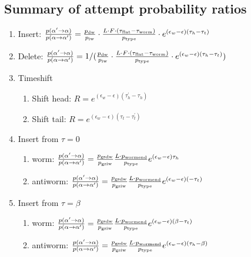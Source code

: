 \documentclass[12pt, two sided]{article}
\begin{document}
\subsection{Summary of attempt probability ratios}
	\begin{enumerate}
	\setcounter{enumi}{0}
		\item Insert: $\frac{p(\alpha^\prime\to\alpha)}{p(\alpha\to\alpha^\prime)} = \frac{p_{\rm{dw}}}{p_{\rm{iw}}} \cdot \frac{L \cdot F \cdot (\tau_{\rm{flat}}-\tau_{\rm{worm}})}{p_{\rm{type}}} \cdot e^{(\epsilon_w-\epsilon)(\tau_h-\tau_t)}$
		\item Delete: $\frac{p(\alpha^\prime\to\alpha)}{p(\alpha\to\alpha^\prime)} = 1/(\frac{p_{\rm{dw}}}{p_{\rm{iw}}} \cdot \frac{L \cdot F \cdot (\tau_{\rm{flat}}-\tau_{\rm{worm}})}{p_{\rm{type}}} \cdot e^{(\epsilon_w-\epsilon)(\tau_h-\tau_t)})$
		\item Timeshift
		\begin{enumerate}
		\item{Shift head: $R =  e^{(\epsilon_w-\epsilon)(\tau_h^\prime-\tau_h)}$}
		\item{Shift tail: $R = e^{(\epsilon_w-\epsilon)(\tau_t-\tau_t^\prime)}$}
		\end{enumerate}
		\item Insert from $\tau=0$
		\begin{enumerate}
		\item{worm: $\frac{p(\alpha^\prime\to\alpha)}{p(\alpha\to\alpha^\prime)} = \frac{p_{\rm{gsdw}}}{p_{\rm{gsiw}}} \frac{L \cdot p_{\rm{wormend}}}{p_{\rm{type}}} e^{(\epsilon_w-\epsilon)\tau_h}$ }
		\item{antiworm: $\frac{p(\alpha^\prime\to\alpha)}{p(\alpha\to\alpha^\prime)} = \frac{p_{\rm{gsdw}}}{p_{\rm{gsiw}}} \frac{L \cdot p_{\rm{wormend}}}{p_{\rm{type}}} e^{(\epsilon_w-\epsilon)(-\tau_t)}$}
		\end{enumerate}
		\item Insert from $\tau=\beta$
		\begin{enumerate}
		\item{worm: $\frac{p(\alpha^\prime\to\alpha)}{p(\alpha\to\alpha^\prime)} = \frac{p_{\rm{gsdw}}}{p_{\rm{gsiw}}} \frac{L \cdot p_{\rm{wormend}}}{p_{\rm{type}}} e^{(\epsilon_w-\epsilon)(\beta-\tau_t)}$}
		\item{antiworm: $\frac{p(\alpha^\prime\to\alpha)}{p(\alpha\to\alpha^\prime)} = \frac{p_{\rm{gsdw}}}{p_{\rm{gsiw}}} \frac{L \cdot p_{\rm{wormend}}}{p_{\rm{type}}} e^{(\epsilon_w-\epsilon)(\tau_h-\beta)}$}
		\end{enumerate}

\end{enumerate}
\end{document}
